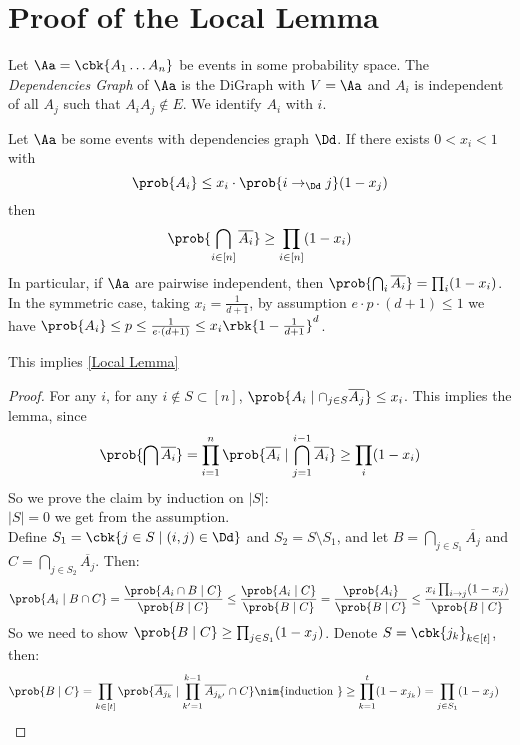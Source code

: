 \documentclass[a4paper, 11pt, oneside]{book}
\begin{document}
\section{Proof of the Local Lemma}
\begin{yellowBox}
\begin{defn}
	 Let $\Aa = \cbk{A_1\ldots A_n}$ be events in some probability space. The \emph{Dependencies Graph} of $\Aa$ is the DiGraph with $V = \Aa$ and $A_i$ is independent of all $A_j$ such that $A_iA_j\notin E$. We identify $A_i$ with $i$.
\end{defn}
\end{yellowBox}
\begin{thm}
	\label{lemma: Local Lemma restate} Let $\Aa$ be some events with dependencies graph $\Dd$. If there exists $0<x_i < 1$ with 
	\[
	\prob{A_i}\le x_i\cdot \prob{i\to_{\Dd} j}(1-x_j)
	\]
	then
	\[
	\prob{\bigcap_{i\in [n]}\overline{A_i}} \ge \prod_{i\in [n]}(1-x_i)
	\]
	In particular, if $\Aa$ are pairwise independent, then $\prob{\bigcap_i\overline{A_i}} = \prod_i(1-x_i)$. In the symmetric case, taking $x_i = \frac{1}{d+1}$, by assumption $e\cdot p\cdot(d+1)\le 1$ we have
	$\prob{A_i}\le p\le \frac{1}{e\cdot(d+1)}\le x_i \rbk{1-\frac{1}{d+1}}^d$.
\end{thm}	
\begin{remark}
	This implies \autoref{Local Lemma}
\end{remark}
\begin{proof}
	For any $i$, for any $i\notin S\subset [n]$, $\prob{A_i\mid \cap_{j\in S}\overline{A_j}}\le x_i$. This implies the lemma, since 
	\[
	\prob{\bigcap \overline{A_i}} = \prod_{i=1}^n\prob{\overline{A_i}\mid \bigcap_{j=1}^{i-1}\overline{A_i}}\ge \prod_i(1-x_i)
	\]
	So we prove the claim by induction on $|S|$:\\
	$|S| = 0$ we get from the assumption.\\
	Define $S_1= \cbk{j\in S \mid (i,j)\in \Dd}$ and $S_2 = S\setminus S_1$, and let $B = \bigcap_{j\in S_1}\overline{A_j}$ and $C = \bigcap_{j\in S_2}\overline{A_j}$. Then:
	\[
	\prob{A_i\mid B\cap C} = \frac{\prob{A_i\cap B\mid C}}{\prob{B\mid C}}\le \frac{\prob{A_i \mid C}}{\prob{B\mid C}} = \frac{\prob{A_i}}{\prob{B\mid C}}\le \frac{x_i\prod_{i\to j}(1-x_j)}{\prob{B\mid C}}
	\]
	So we need to show $\prob{B\mid C}\ge \prod_{j\in S_1}(1-x_j)$. Denote $S = \cbk{j_k}_{k\in [t]}$, then:
	\begin{align*}
		& \prob{B\mid C} = \prod_{k\in [t]}\prob{\overline{A_{j_k}}\mid \prod_{k'=1}^{k-1}\overline {A_{j_{k'}}}\cap C}\nim{\text{induction }}\ge \prod_{k=1}^t(1-x_{j_k}) = \prod_{j\in S_1}(1-x_j)
	\end{align*}
	
	\end{proof}
\end{document}
